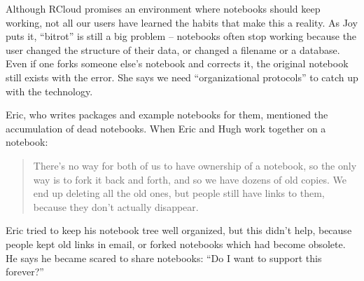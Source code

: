 Although RCloud promises an environment where notebooks should keep working,
not all our users have learned the habits that make this a reality. As Joy
puts it, ``bitrot'' is still a big problem -- notebooks often
stop working because the user changed the structure of their data, or
changed a filename or a database. Even if one forks someone
else's notebook and corrects it, the original notebook still exists with
the error. She says we need ``organizational protocols'' to catch up with the technology.

Eric, who writes packages and example notebooks for them, mentioned the
accumulation of dead notebooks. When Eric and Hugh work together on a notebook:
\begin{quote}
There's no way for both of us to have ownership of a notebook, so the only
way is to fork it back and forth, and so we have dozens of old copies. We
end up deleting all the old ones, but people still have links to them,
because they don't actually disappear.
\end{quote}

Eric tried to keep his notebook
tree well organized, but this didn't help, because people kept old links
in email, or forked notebooks which had become obsolete.
He says he became scared to share notebooks: ``Do I want to support this forever?''
